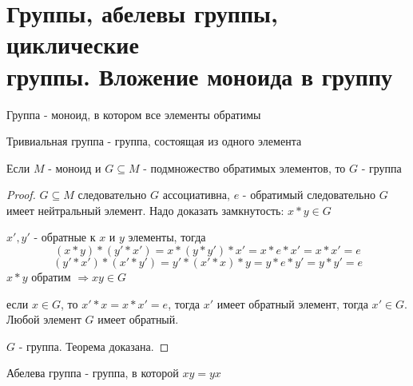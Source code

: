 \documentclass[../main/document.tex]{subfiles}
\begin{document}
\section{Группы, абелевы группы, циклические\\ группы. Вложение моноида в группу}
\begin{dfn}[Группа]
Группа - моноид, в котором все элементы обратимы
\end{dfn}
\begin{dfn}
Тривиальная группа - группа, состоящая из одного элемента
\end{dfn}
\begin{thm}
Если $M$ - моноид и $G\subseteq M$ - подмножество обратимых элементов, то $G$ - группа
\begin{proof}

$G\subseteq M$ следовательно $G$ ассоциативна, 
$e$ - обратимый следовательно $G$ имеет нейтральный элемент. 
Надо доказать замкнутость: $x*y\in G$

$x',y'$ - обратные к $x$ и $y$ элементы, тогда
$$(x*y)*(y'*x')=x*(y*y')*x'=x*e*x'=x*x'=e$$
$$(y'*x')*(x'*y')=y'*(x'*x)*y=y*e*y'=y*y'=e$$
$x*y$ обратим $\Rightarrow xy\in G$

если $x\in G$, то $x'*x=x*x'=e$, тогда $x'$  имеет обратный элемент, тогда $x'\in G$. Любой элемент $G$ имеет обратный.

$G$ - группа. Теорема доказана.

\end{proof}
\end{thm}
\begin{dfn}
Абелева группа - группа, в которой $xy=yx$
\end{dfn}
\begin{dfn}
\end{dfn}
\end{document}
